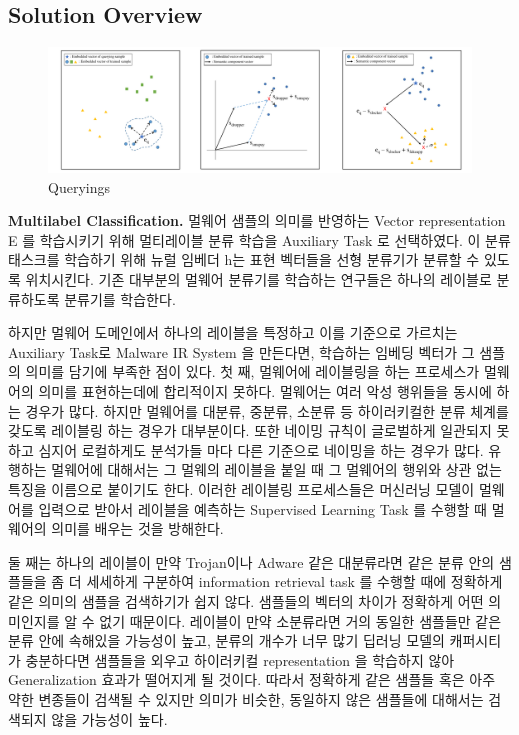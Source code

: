 \subsection{Solution Overview}
\begin{figure}[!htb] %
  \includegraphics[width=\textwidth]{../figures/qualitative_all.pdf}
  \caption{Queryings}
  \label{fig:qualitative_all}
\end{figure}

\textbf{Multilabel Classification. }
멀웨어 샘플의 의미를 반영하는 Vector representation E 를 학습시키기 위해 멀티레이블 분류 학습을 Auxiliary Task 로 선택하였다. 이 분류 태스크를 학습하기 위해 뉴럴 임베더 h는 표현 벡터들을 선형 분류기가 분류할 수 있도록 위치시킨다. 기존 대부분의 멀웨어 분류기를 학습하는 연구들은 하나의 레이블로 분류하도록 분류기를 학습한다. 

하지만 멀웨어 도메인에서 하나의 레이블을 특정하고 이를 기준으로 가르치는 Auxiliary Task로 Malware IR System 을 만든다면, 학습하는 임베딩 벡터가 그 샘플의 의미를 담기에 부족한 점이 있다. 첫 째, 멀웨어에 레이블링을 하는 프로세스가 멀웨어의 의미를 표현하는데에 합리적이지 못하다. 멀웨어는 여러 악성 행위들을 동시에 하는 경우가 많다. 하지만 멀웨어를 대분류, 중분류, 소분류 등 하이러키컬한 분류 체계를 갖도록 레이블링 하는 경우가 대부분이다. 또한 네이밍 규칙이 글로벌하게 일관되지 못하고 심지어 로컬하게도 분석가들 마다 다른 기준으로 네이밍을 하는 경우가 많다. 유행하는 멀웨어에 대해서는 그 멀웨의 레이블을 붙일 때 그 멀웨어의 행위와 상관 없는 특징을 이름으로 붙이기도 한다. 이러한 레이블링 프로세스들은 머신러닝 모델이 멀웨어를 입력으로 받아서 레이블을 예측하는 Supervised Learning Task 를 수행할 때 멀웨어의 의미를 배우는 것을 방해한다. 

둘 째는 하나의 레이블이 만약 Trojan이나 Adware 같은 대분류라면 같은 분류 안의 샘플들을 좀 더 세세하게 구분하여 information retrieval task 를 수행할 때에 정확하게 같은 의미의 샘플을 검색하기가 쉽지 않다. 샘플들의 벡터의 차이가 정확하게 어떤 의미인지를 알 수 없기 때문이다. 레이블이 만약 소분류라면 거의 동일한 샘플들만 같은 분류 안에 속해있을 가능성이 높고, 분류의 개수가 너무 많기 딥러닝 모델의 캐퍼시티가 충분하다면 샘플들을 외우고 하이러키컬 representation 을 학습하지 않아 Generalization 효과가 떨어지게 될 것이다. 따라서 정확하게 같은 샘플들 혹은 아주 약한 변종들이 검색될 수 있지만 의미가 비슷한, 동일하지 않은 샘플들에 대해서는 검색되지 않을 가능성이 높다. 

